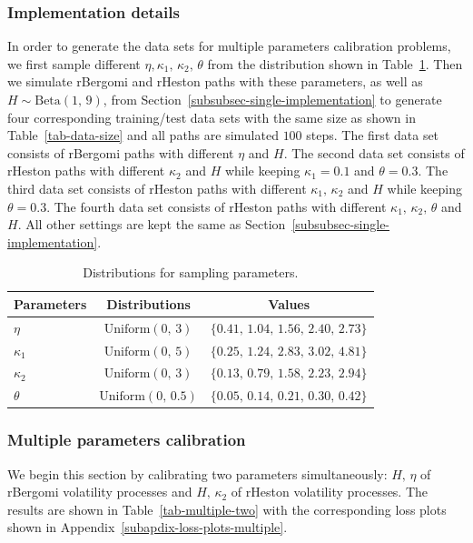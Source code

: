 \documentclass[]{article}
\renewcommand{\(}{\left(}
\renewcommand{\)}{\right)}
\begin{document}
	\subsubsection{Implementation details}
	\label{subsubsec-multiple-implementation}
	In order to generate the data sets for multiple parameters calibration problems, we first sample different $\eta,\kappa_1,\,\kappa_2,\,\theta$ from the distribution shown in Table~\ref{tab-multiple-distribution}. Then we simulate rBergomi and rHeston paths with these parameters, as well as $H\sim\text{Beta}(1,\,9)$, from Section~\ref{subsubsec-single-implementation} to generate four corresponding training/test data sets with the same size as shown in Table~\ref{tab-data-size} and all paths are simulated $100$ steps. The first data set consists of rBergomi paths with different $\eta$ and $H$. The second data set consists of rHeston paths with different $\kappa_2$ and $H$ while keeping $\kappa_1=0.1$ and $\theta=0.3$. The third data set consists of rHeston paths with different $\kappa_1,\,\kappa_2$ and $H$ while keeping $\theta=0.3$. The fourth data set consists of rHeston paths with different $\kappa_1,\,\kappa_2,\,\theta$ and $H$. All other settings are kept the same as Section~\ref{subsubsec-single-implementation}.
	\begin{table}[H]
		\caption{Distributions for sampling parameters.}
		\label{tab-multiple-distribution}
		\smallskip
		\centering
		\renewcommand\arraystretch{1.5}
		\begin{tabular}{l c c}
			\toprule
			Parameters&Distributions&Values\\
			\hline
			$\eta$&$\text{Uniform}(0,\,3)$&$\{0.41,\,1.04,\,1.56,\,2.40,\,2.73\}$\\
			$\kappa_1$&$\text{Uniform}(0,\,5)$&$\{0.25,\,1.24,\,2.83,\,3.02,\,4.81\}$\\
			$\kappa_2$&$\text{Uniform}(0,\,3)$&$\{0.13,\,0.79,\,1.58,\,2.23,\,2.94\}$\\
			$\theta$&$\text{Uniform}(0,\,0.5)$&$\{0.05,\,0.14,\,0.21,\,0.30,\,0.42\}$\\
			\bottomrule
		\end{tabular}
	\end{table}
	
	\subsubsection{Multiple parameters calibration}
	\label{subsubsec-multiple-attention}
	We begin this section by calibrating two parameters simultaneously: $H,\,\eta$ of rBergomi volatility processes and $H,\,\kappa_2$ of rHeston volatility processes. The results are shown in Table~\ref{tab-multiple-two} with the corresponding loss plots shown in Appendix~\ref{subapdix-loss-plots-multiple}.
	
\end{document}

